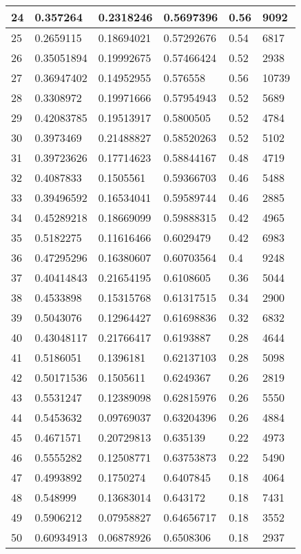 \begin{longtable}{|l|l|l|l|l|l|}
24 & 0.357264 & 0.2318246 & 0.5697396 & 0.56 & 9092 \\ \hline 
25 & 0.2659115 & 0.18694021 & 0.57292676 & 0.54 & 6817 \\ \hline 
26 & 0.35051894 & 0.19992675 & 0.57466424 & 0.52 & 2938 \\ \hline 
27 & 0.36947402 & 0.14952955 & 0.576558 & 0.56 & 10739 \\ \hline 
28 & 0.3308972 & 0.19971666 & 0.57954943 & 0.52 & 5689 \\ \hline 
29 & 0.42083785 & 0.19513917 & 0.5800505 & 0.52 & 4784 \\ \hline 
30 & 0.3973469 & 0.21488827 & 0.58520263 & 0.52 & 5102 \\ \hline 
31 & 0.39723626 & 0.17714623 & 0.58844167 & 0.48 & 4719 \\ \hline 
32 & 0.4087833 & 0.1505561 & 0.59366703 & 0.46 & 5488 \\ \hline 
33 & 0.39496592 & 0.16534041 & 0.59589744 & 0.46 & 2885 \\ \hline 
34 & 0.45289218 & 0.18669099 & 0.59888315 & 0.42 & 4965 \\ \hline 
35 & 0.5182275 & 0.11616466 & 0.6029479 & 0.42 & 6983 \\ \hline 
36 & 0.47295296 & 0.16380607 & 0.60703564 & 0.4 & 9248 \\ \hline 
37 & 0.40414843 & 0.21654195 & 0.6108605 & 0.36 & 5044 \\ \hline 
38 & 0.4533898 & 0.15315768 & 0.61317515 & 0.34 & 2900 \\ \hline 
39 & 0.5043076 & 0.12964427 & 0.61698836 & 0.32 & 6832 \\ \hline 
40 & 0.43048117 & 0.21766417 & 0.6193887 & 0.28 & 4644 \\ \hline 
41 & 0.5186051 & 0.1396181 & 0.62137103 & 0.28 & 5098 \\ \hline 
42 & 0.50171536 & 0.1505611 & 0.6249367 & 0.26 & 2819 \\ \hline 
43 & 0.5531247 & 0.12389098 & 0.62815976 & 0.26 & 5550 \\ \hline 
44 & 0.5453632 & 0.09769037 & 0.63204396 & 0.26 & 4884 \\ \hline 
45 & 0.4671571 & 0.20729813 & 0.635139 & 0.22 & 4973 \\ \hline 
46 & 0.5555282 & 0.12508771 & 0.63753873 & 0.22 & 5490 \\ \hline 
47 & 0.4993892 & 0.1750274 & 0.6407845 & 0.18 & 4064 \\ \hline 
48 & 0.548999 & 0.13683014 & 0.643172 & 0.18 & 7431 \\ \hline 
49 & 0.5906212 & 0.07958827 & 0.64656717 & 0.18 & 3552 \\ \hline 
50 & 0.60934913 & 0.06878926 & 0.6508306 & 0.18 & 2937 \\ \hline 
\end{longtable}